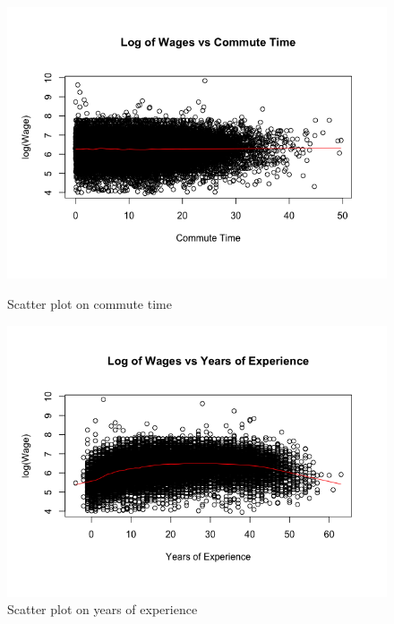 \documentclass{article}
\begin{document}
      \begin{figure}
        \centering
        \begin{minipage}{.45\textwidth}
          \centering
          \includegraphics[scale=0.35]{transformation/scattercom}
          \caption{Scatter plot on commute time}
          \label{fig:scattercom}

          \includegraphics[scale=0.35]{transformation/scatterexp}
          \caption{Scatter plot on years of experience}
          \label{fig:scatterexp}


\end{minipage}
\end{figure}
\end{document}
